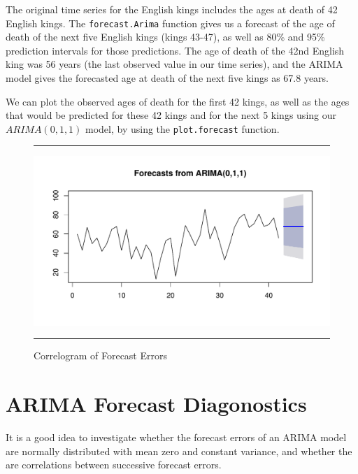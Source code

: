 \documentclass[11pt, letterpaper, twoside]{memoir}\usepackage{knitr}
\begin{document}
The original time series for the English kings includes the ages at death of 42 English kings. The \texttt{forecast.Arima} function gives us a forecast of the age of death of the next five English kings (kings 43-47), as well as 80\% and 95\% prediction intervals for those predictions. The age of death of the 42nd English king was 56 years (the last observed value in our time series), and the ARIMA model gives the forecasted age at death of the next five kings as 67.8 years.

We can plot the observed ages of death for the first 42 kings, as well as the ages that would be predicted for these 42 kings and for the next 5 kings using our $ARIMA(0,1,1)$ model, by using the \texttt{plot.forecast} function.

\begin{figure}
\centering
\rule{4in}{1pt}
\begin{knitrout}
\color{fgcolor}\begin{kframe}
\begin{alltt}
\end{alltt}
\end{kframe}
\includegraphics[width=\maxwidth]{figure/unnamed-chunk-128-1} 

\end{knitrout}
\caption{Correlogram of Forecast Errors}
\label{Fig:correrrking}
\rule{4in}{1pt}
\end{figure}

\section{ARIMA Forecast Diagonostics}

It is a good idea to investigate whether the forecast errors of an ARIMA model are normally distributed with mean zero and constant variance, and whether the are correlations between successive forecast errors.
\end{document}
